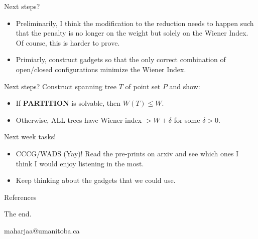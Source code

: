 \documentclass[11pt]{beamer}
\makeatletter
\newcommand{\email}{maharjaa@umanitoba.ca}
\makeatother
\begin{document}
\begin{frame}{Next steps?}
	\begin{itemize}
		\item Preliminarily, I think the modification to the reduction needs to happen such that the penalty is no longer on the weight but solely on the Wiener Index. Of course, this is harder to prove.
		\item Primiarly, construct gadgets so that the only correct combination of open/closed configurations minimize the Wiener Index.
	\end{itemize}
\end{frame}

\begin{frame}{Next steps?}
	Construct spanning tree $T$ of point set $P$ and show:
	\begin{itemize}
		\item If \textbf{PARTITION} is solvable, then $W(T) \leq W$.
		\item Otherwise, ALL trees have Wiener index $> W + \delta$ for some $\delta > 0$.
	\end{itemize}
\end{frame}

\begin{frame}{Next week tasks!}
	\begin{itemize}
		\item CCCG/WADS (Yay)! Read the pre-prints on arxiv and see which ones I think I would enjoy listening in the most.
		\item Keep thinking about the gadgets that we could use.
	\end{itemize}
\end{frame}

\begin{frame}[allowframebreaks]{References}
	
\end{frame}

\begin{frame}
	\begin{center}
		The end.

		\email
	\end{center}
\end{frame}
\end{document}
